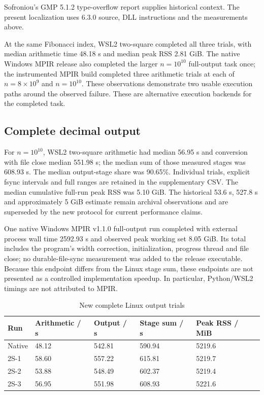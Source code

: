 \documentclass[11pt,a4paper]{article}
\begin{document}
Sofroniou's GMP 5.1.2 type-overflow report \cite{gmp_size_overflow} supplies historical context. The present localization uses 6.3.0 source, DLL instructions and the measurements above.

At the same Fibonacci index, WSL2 two-square completed all three trials, with median arithmetic time 48.18 s and median peak RSS 2.81 GiB. The native Windows MPIR release also completed the larger $n=10^{10}$ full-output task once; the instrumented MPIR build completed three arithmetic trials at each of $n=8\times 10^{9}$ and $n=10^{10}$. These observations demonstrate two usable execution paths around the observed failure. These are alternative execution backends for the completed task.

\subsection{Complete decimal output}

For $n=10^{10}$, WSL2 two-square arithmetic had median 56.95 s and conversion with file close median 551.98 s; the median sum of those measured stages was 608.93 s. The median output-stage share was 90.65\%. Individual trials, explicit fsync intervals and full ranges are retained in the supplementary CSV. The median cumulative full-run peak RSS was 5.10 GiB. The historical 53.6 s, 527.8 s and approximately 5 GiB estimate remain archival observations and are superseded by the new protocol for current performance claims.

One native Windows MPIR v1.1.0 full-output run completed with external process wall time 2592.93 s and observed peak working set 8.05 GiB. Its total includes the program's width correction, initialization, progress thread and file close; no durable-file-sync measurement was added to the release executable. Because this endpoint differs from the Linux stage sum, these endpoints are not presented as a controlled implementation speedup. In particular, Python/WSL2 timings are not attributed to MPIR.

\begin{table}[htbp]
\centering\small
\caption{New complete Linux output trials}
\begin{tabularx}{\linewidth}{lXXXX}
\toprule
Run & Arithmetic / s & Output / s & Stage sum / s & Peak RSS / MiB \\
\midrule
Native & 48.12 & 542.81 & 590.94 & 5219.6 \\
2S-1 & 58.60 & 557.22 & 615.81 & 5219.7 \\
2S-2 & 53.88 & 548.49 & 602.37 & 5219.4 \\
2S-3 & 56.95 & 551.98 & 608.93 & 5221.6 \\
\bottomrule
\end{tabularx}

\end{table}
\end{document}
